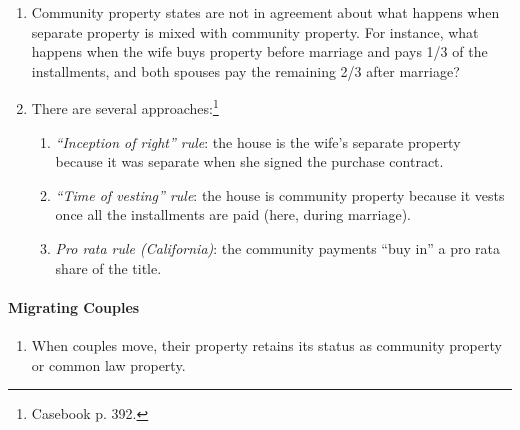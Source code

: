 \begin{enumerate}
    \item Community property states are not in agreement about what happens 
    when separate property is mixed with community property. For instance, 
    what happens when the wife buys property before marriage and pays 1/3 of 
    the installments, and both spouses pay the remaining 2/3 after marriage?
    \item There are several approaches:\footnote{Casebook p. 392.}
    \begin{enumerate}
        \item \emph{``Inception of right'' rule}: the house is the wife's 
        separate property because it was separate when she signed the 
        purchase contract.
        \item \emph{``Time of vesting'' rule}: the house is community property 
        because it vests once all the installments are paid (here, during 
        marriage).
        \item \emph{Pro rata rule (California)}: the community payments ``buy 
        in'' a pro rata share of the title.
    \end{enumerate}
\end{enumerate}

\paragraph{Migrating Couples}

\begin{enumerate}
    \item When couples move, their property retains its status as community 
    property or common law property.
\end{enumerate}
